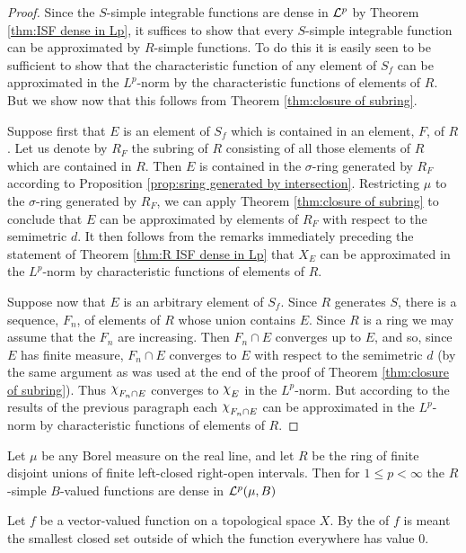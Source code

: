 \begin{proof}
Since the $S$-simple integrable functions are dense in ${\cal L}^p$ by Theorem \ref{thm:ISF dense in Lp}, it suffices to show that every $S$-simple integrable function can be approximated by $R$-simple functions. To do this it is easily seen to be sufficient to show that the characteristic function of any element of $S_f$ can be approximated in the $L^p$-norm by the characteristic functions of elements of $R$. But we show now that this follows from Theorem \ref{thm:closure of subring}.

Suppose first that $E$ is an element of $S_f$ which is contained in an element, $F$, of $R$. Let us denote by $R_F$ the subring of $R$ consisting of all those elements of $R$ which are contained in $R$. %
Then $E$ is contained in the $\sigma$-ring generated by $R_F$ according to Proposition \ref{prop:sring generated by intersection}. Restricting $\mu$ to the $\sigma$-ring generated by $R_F$, we can apply Theorem \ref{thm:closure of subring} to conclude that $E$ can be approximated by elements of $R_F$ with respect to the semimetric $d$. It then follows from the remarks immediately preceding the statement of Theorem \ref{thm:R ISF dense in Lp} that $X_E$ can be approximated in the $L^p$-norm by characteristic functions of elements of $R$.

Suppose now that $E$ is an arbitrary element of $S_f$. Since $R$ generates $S$, there is a sequence, $F_n$, of elements of $R$ whose union contains $E$. Since $R$ is a ring we may assume that the $F_n$ are increasing. Then $F_n\cap E$ converges up to $E$, and so, since $E$ has finite measure, $F_n\cap E$ converges to $E$ with respect to the semimetric $d$ (by the same argument as was used at the end of the proof of Theorem \ref{thm:closure of subring}). Thus $\idf{F_n\cap E}$ converges to $\idf{E}$ in the $L^p$-norm. But according to the results of the previous paragraph each $\idf{F_n\cap E}$ can be approximated in the $L^p$-norm by characteristic functions of elements of $R$.
\end{proof}

\begin{corollary}\label{cor:lclosed ropen ISF dense in Lp}
Let $\mu$ be any Borel measure on the real line, and let $R$ be the ring of finite disjoint unions of finite left-closed right-open intervals. Then for $1\leq p<\infty$ the $R$-simple $B$-valued functions are dense in ${\cal L}^p(\mu, B)$
\end{corollary}

\begin{definition}
Let $f$ be a vector-valued function on a topological space $X$. By the  of $f$ is meant the smallest closed set outside of which the function everywhere has value $0$.
\end{definition}

